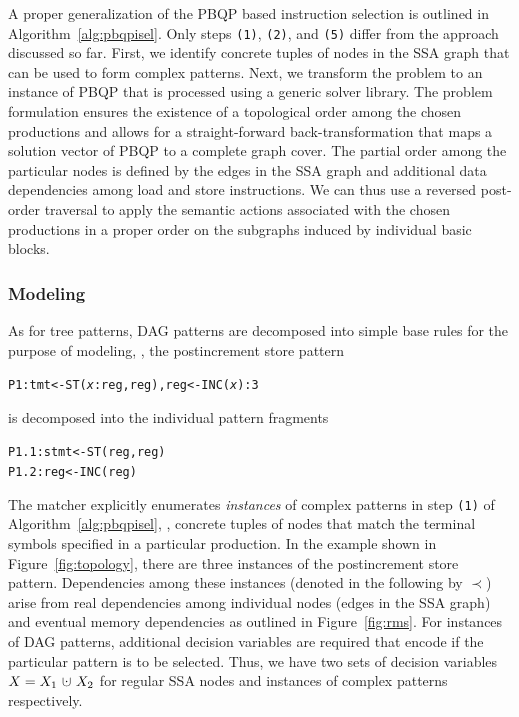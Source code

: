 A proper generalization of the PBQP based instruction selection
\cite{Ebner08} is outlined in Algorithm~\ref{alg:pbqpisel}. Only steps
\texttt{(1)}, \texttt{(2)}, and \texttt{(5)} differ from the approach
discussed so far. First, we identify concrete tuples of nodes in the
SSA graph that can be used to form complex patterns. Next, we
transform the problem to an instance of PBQP that is processed using a
generic solver library. The problem formulation ensures the existence
of a topological order among the chosen productions and allows for a
straight-forward back-transformation that maps a solution vector of
PBQP to a complete graph cover. The partial order among the particular
nodes is defined by the edges in the SSA graph and additional data
dependencies among load and store instructions.  We can thus use a
reversed post-order traversal to apply the semantic actions associated
with the chosen productions in a proper order on the subgraphs induced
by individual basic blocks.

\subsubsection{Modeling}
As for tree patterns, DAG patterns are decomposed into simple base
rules for the purpose of modeling, \eg, the postincrement store
pattern
\begin{alltt}
  P1: tmt <- ST(\textit{x}:reg, reg), reg <- INC(\textit{x}) : 3
\end{alltt}
is decomposed into the individual pattern fragments
\begin{alltt}
  P1.1: stmt <- ST(reg, reg)
  P1.2: reg  <- INC(reg)
\end{alltt}
The matcher explicitly enumerates \emph{instances\/} of complex
patterns in step \texttt{(1)} of Algorithm~\ref{alg:pbqpisel}, \ie,
concrete tuples of nodes that match the terminal symbols specified in
a particular production. In the example shown in
Figure~\ref{fig:topology}, there are three instances of the
postincrement store pattern. Dependencies among these instances
(denoted in the following by $\prec$) arise from real dependencies
among individual nodes (edges in the SSA graph) and eventual memory
dependencies as outlined in Figure~\ref{fig:rms}.
For instances of DAG patterns, additional decision variables are
required that encode if the particular pattern is to be
selected. Thus, we have two sets of decision variables
$X=X_1~\dotcup~X_2$ for regular SSA nodes and instances of complex
patterns respectively.

